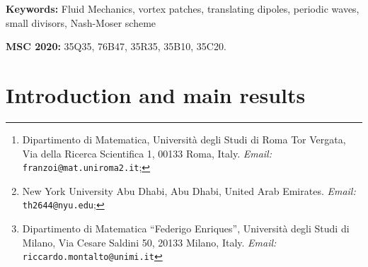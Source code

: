 \documentclass[a4paper,reqno,10pt]{article}
\date{}
\title
{\bf Time-periodic vortices near translating symmetric dipole patches}
\author{Luca Franzoi\footnote{
	Dipartimento di Matematica, Universit\`a degli Studi di Roma Tor Vergata, Via della Ricerca Scientifica 1, 00133 Roma, Italy. \textit{Email:} \texttt{franzoi@mat.uniroma2.it};}, \quad 
    Taoufik Hmidi\footnote{New York University Abu Dhabi, Abu Dhabi, United Arab Emirates.
	 	\textit{Email:} \texttt{th2644@nyu.edu}; 
	}, \quad  Riccardo Montalto\footnote{Dipartimento di Matematica ``Federigo Enriques'', Universit\`a degli Studi di Milano, Via Cesare Saldini 50, 20133 Milano, Italy. \textit{Email:} \texttt{riccardo.montalto@unimi.it}}}
\begin{document}
\maketitle


\begin{abstract}
 We prove the existence of time-periodic solutions of the two-dimensional incompressible Euler equations bifurcating from a translating vortex pair. The reference configuration consists of two symmetric vortex patches of equal strength and opposite sign traveling at constant speed. In a regime of large separation between the vortices, the dynamics may be viewed as a small perturbation of an integrable system.
Working in a co-moving frame and using the contour dynamics formulation, we reduce the problem to a nonlinear transport equation for the vortex boundaries. The linearized operator exhibits degeneracies associated with symmetries and transport effects. By combining a Lyapunov–Schmidt reduction, Nash–Moser scheme, and spectral analysis with sharp asymptotic expansions of the eigenvalues in order to overcome the degeneracy, we construct families of non-rigid, time-periodic vortex patch solutions for a large Cantor set of parameters. The analysis reveals that translating dipoles possess a surprisingly rich nearby dynamics, far beyond the classical rigid paradigm usually associated with vortex patch motion. More generally, the approach developed in this work is flexible and robust, and is expected to extend to a broader class of nonlocal PDEs from Fluid Mechanics with degenerate behaviours.
\end{abstract}

 \medskip

\noindent
{\bf Keywords:} Fluid Mechanics, vortex patches, translating dipoles, periodic waves, small divisors, Nash-Moser scheme


\noindent
{\bf MSC 2020:}
35Q35, %
76B47, %
35R35, %
35B10, %
35C20. %



\tableofcontents

\section{Introduction and main results}
\end{document}
